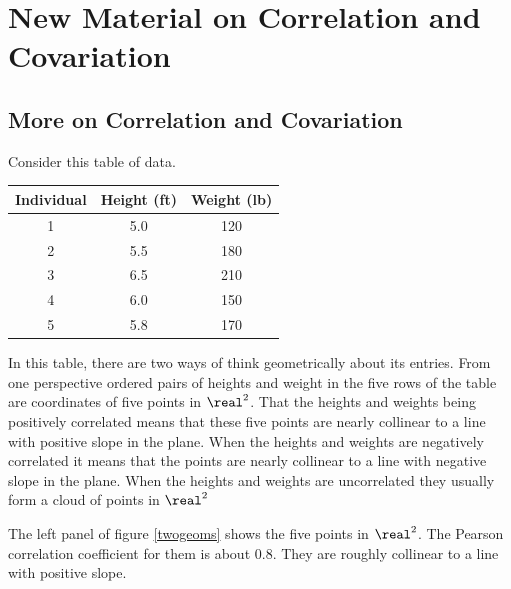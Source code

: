 \chapter{New Material on Correlation and Covariation}

\section{More on Correlation and Covariation}

 Consider this table of data.
\begin{center}
\begin{tabular}{ccc}
\textbf{Individual} & \textbf{Height (ft)} & \textbf{Weight (lb)} \\
\hline
1 & 5.0 & 120 \\
2 & 5.5 & 180 \\
3 & 6.5 & 210 \\
4 & 6.0 & 150 \\
5 & 5.8 & 170 \\
\end{tabular}
\end{center}

In this table, there are two ways of think geometrically about its entries. From one perspective  ordered pairs of heights and weight in the five rows of  the table are coordinates of five points in $\real^2$.
That the heights and weights being positively correlated means that these five 
points are nearly collinear to a line with positive slope in the plane.  When 
the heights and weights are negatively correlated it means that the points are 
nearly collinear to a line with negative slope in the plane.  When the heights 
and weights are uncorrelated they usually form a cloud of points in $\real^2$ 
\label{twogeoms}

   The left panel of figure \ref{twogeoms} shows the five points in $\real^2$.
The Pearson correlation coefficient for them is about $0.8$.  They are roughly 
collinear to a line with positive slope.


